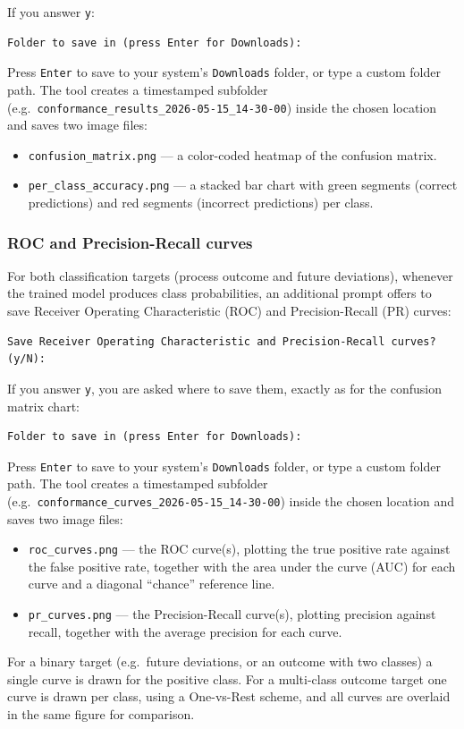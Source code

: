 \documentclass[12pt,a4paper]{article}
\begin{document}
If you answer \texttt{y}:
\begin{verbatim}
Folder to save in (press Enter for Downloads):
\end{verbatim}
Press \texttt{Enter} to save to your system's \texttt{Downloads} folder, or type a custom folder path. The tool creates a timestamped subfolder \\(e.g.\ \verb|conformance_results_2026-05-15_14-30-00|) inside the chosen location and saves two image files:
\begin{itemize}
    \item \texttt{confusion\_matrix.png} --- a color-coded heatmap of the confusion matrix.
    \item \texttt{per\_class\_accuracy.png} --- a stacked bar chart with green segments (correct predictions) and red segments (incorrect predictions) per class.
\end{itemize}

\subsubsection{ROC and Precision-Recall curves}
For both classification targets (process outcome and future deviations), whenever the trained model produces class probabilities, an additional prompt offers to save Receiver Operating Characteristic (ROC) and Precision-Recall (PR) curves:
\begin{verbatim}
Save Receiver Operating Characteristic and Precision-Recall curves? (y/N):
\end{verbatim}

If you answer \texttt{y}, you are asked where to save them, exactly as for the confusion matrix chart:
\begin{verbatim}
Folder to save in (press Enter for Downloads):
\end{verbatim}
Press \texttt{Enter} to save to your system's \texttt{Downloads} folder, or type a custom folder path. The tool creates a timestamped subfolder \\(e.g.\ \verb|conformance_curves_2026-05-15_14-30-00|) inside the chosen location and saves two image files:
\begin{itemize}
    \item \texttt{roc\_curves.png} --- the ROC curve(s), plotting the true positive rate against the false positive rate, together with the area under the curve (AUC) for each curve and a diagonal ``chance'' reference line.
    \item \texttt{pr\_curves.png} --- the Precision-Recall curve(s), plotting precision against recall, together with the average precision for each curve.
\end{itemize}
For a binary target (e.g.\ future deviations, or an outcome with two classes) a single curve is drawn for the positive class. For a multi-class outcome target one curve is drawn per class, using a One-vs-Rest scheme, and all curves are overlaid in the same figure for comparison.
\end{document}
